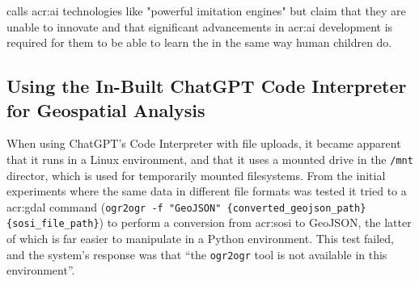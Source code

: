 \begin{comment}
In this section it is important to include a discussion of not just the merits of the work conducted, but also the limitations.
Which choices did you make? Why? What alternatives were there?
{\color{red}\textbf{Note that a key part of the Master's Thesis grading is based on the student's ability to discuss the results in light of the work by others as well as the restrictions and potential of the work itself.}}
While the Results section will report the outcome of each specific experiments, the Discussion should put those results into perspective and look at overall lessons that can be learned from the entire series of experiments.

You should be able to discuss your work in relation to its overall goal and your research questions (i.e., those introduced in Chapter~\ref{cha:introduction}),
but also address issues such as any ethical considerations that the work may entail,
as well as its technical challenges and limitations.

Discussion and evaluation can either be two different chapters, a joint chapter (as here), or part of the concluding chapter
--- or the discussion can be part of that chapter while the evaluation is part of the experimental chapter.

As for most parts of the thesis, it is possible to select various outlines and setups for the discussion; the important thing is that all the relevant parts appear \textit{somewhere\/} in the text.
\end{comment}

\cite{yiuTransmissionTruthImitation2023} calls \acrshort{acr:ai} technologies like  "powerful imitation engines" but claim that they are unable to innovate and that significant advancements in \acrshort{acr:ai} development is required for them to be able to learn the in the same way human children do.

\subsection{Using the In-Built ChatGPT Code Interpreter for Geospatial Analysis}

When using ChatGPT's Code Interpreter with file uploads, it became apparent that it runs in a Linux environment, and that it uses a mounted drive  in the \texttt{/mnt} director, which is used for temporarily mounted filesystems. From the initial experiments where the same data in different file formats was tested it tried to a \acrshort{acr:gdal} command (\texttt{ogr2ogr -f "GeoJSON" \{converted\_geojson\_path\} \{sosi\_file\_path\}}) to perform a conversion from \acrshort{acr:sosi} to GeoJSON, the latter of which is far easier to manipulate in a Python environment. This test failed, and the system's response was that \enquote{the \texttt{ogr2ogr} tool is not available in this environment}.

